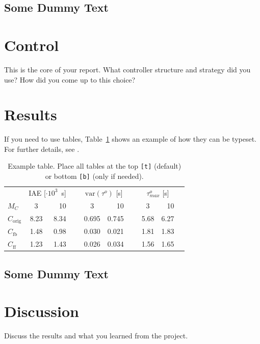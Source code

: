 \documentclass{LTHtwocol} %
\begin{document}
\subsection{Some Dummy Text}
\kant[3]

\section{Control}
This is the core of your report. What controller structure and strategy did you use? How did you come up to this choice?

\section{Results}
If you need to use tables, Table~\ref{tab:extable} shows an example of how they can be typeset. For further details, see \cite{tablelatexwiki}.

\begin{table}[t]
	\centering
	\caption{Example table. Place all tables at the top \texttt{[t]} (default) or bottom \texttt{[b]} (only if needed).}
	\label{tab:extable}
	\begin{tabular}{lcrrcrrcrr} %
		\toprule
        & 
		\multicolumn{2}{c}{IAE [$\cdot 10^3$~s]} & &
		\multicolumn{2}{c}{$\text{var}(\tau^o)$ [s]} & &  
		\multicolumn{2}{c}{$\tau^o_{max}$ [s]} \\[1mm]
		$M_C$            &  3     & 10  &~& 3     & 10    &~& 3    & 10 \\ 
        \midrule
		$C_{\text{orig}}$ & 8.23 & 8.34 &~& 0.695 & 0.745 &~& 5.68 & 6.27 \\ 
		$C_{\text{fb}}$ & 1.48 & 0.98 &~& 0.030 & 0.021 &~& 1.81 & 1.83 \\ 
		$C_{\text{ff}}$ & 1.23 & 1.43 &~& 0.026 & 0.034 &~& 1.56 & 1.65\\
        \bottomrule 
	\end{tabular}
\end{table}

\subsection{Some Dummy Text}
\kant[4]

\section{Discussion}

Discuss the results and what you learned from the project.


\printbibliography
\end{document}
